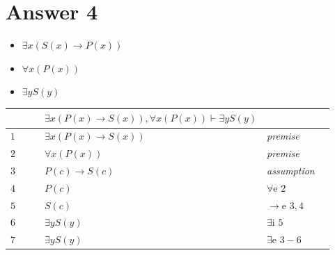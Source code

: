 \documentclass[12pt]{article}
\begin{document}
\section*{Answer 4}

\begin{itemize}
\centering
    \item $\exists x(S(x) \rightarrow P(x))$
    \item $\forall x(P(x)) $
    \item $\exists yS(y)$
\end{itemize}

\begin{table}[H]
	\centering

	\begin{tabular}{*6{l}}
        $ $ & & & $ \exists x(P(x) \rightarrow S(x)),\forall x(P(x)) \vdash \exists yS(y)   $ & &\\
        \hline
        \hline

		$1$ & & & $ \exists x(P(x) \rightarrow S(x))$ &\textit{premise} &\\

		$2$ & & & $ \forall x(P(x)) $ &\textit{premise} &\\ \cline{2-6}

		$3$ &\multicolumn{1}{|c}{}& & $ P(c) \rightarrow S(c)$ & {\textit{assumption}} & \multicolumn{1}{c|}{}\\

		$4$ &\multicolumn{1}{|c}{} & & $P(c)$ & $\forall$e $2$ & \multicolumn{1}{c|}{}\\

		$5$ &\multicolumn{1}{|c}{} & & $S(c) $ & $\rightarrow$e $3,4$ & \multicolumn{1}{c|}{}\\

		$6$ &\multicolumn{1}{|c}{}& & $ \exists yS(y)$ & {$\exists$i $5$}&\multicolumn{1}{c|}{}\\\cline{2-6}

		$7$ & & & $\exists yS(y)$ & {$\exists$e $3-6$}& \\


	\end{tabular}
\end{table}
\end{document}
